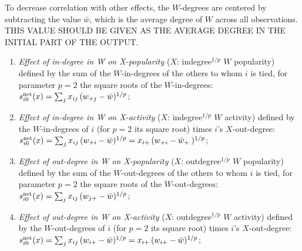 \documentclass[a4paper,fleqn]{article}
\newcommand{\+}{\, + \,}
\newcommand{\vit}{\theenumi}
\newcounter{savenumi}
\begin{document}
{To decrease correlation with other effects, the
$W$-degrees are centered by subtracting the value $\bar w$,
which is the average degree of $W$ across all observations.\\
THIS VALUE SHOULD BE GIVEN AS THE AVERAGE DEGREE IN THE INITIAL PART
OF THE OUTPUT.

\begin{enumerate}
\setcounter{enumi}{\value{savenumi}}
 \item {\em Effect of in-degree in W on X-popularity } ($X$: indegree$^{1/p}$ $W$ popularity)
 defined by   the sum of  the $W$-in-degrees of the others to whom $i$ is tied,
 for parameter $p = 2$ the square roots of the $W$-in-degrees:\\
 $s^{\rm net}_{i\vit}(x) =  \sum_j x_{ij}\, (w_{+j} - \bar w)^{1/p}  $;\\

 \item {\em Effect of in-degree in W on X-activity } ($X$: indegree$^{1/p}$ $W$ activity)
 defined by the $W$-in-degrees of $i$ (for $p = 2$ its square root)
 times $i$'s $X$-out-degree:\\
 $s^{\rm net}_{i\vit}(x) =  \sum_j x_{ij}\, (w_{+i} - \bar w)^{1/p}
                 =  x_{i+}\, (w_{+i} - \bar w_{+.}) ^{1/p} $;\\

 \item {\em Effect of out-degree in W on X-popularity } ($X$: outdegree$^{1/p}$ $W$ popularity)
 defined by   the sum of  the $W$-out-degrees of the others to whom $i$ is tied,
 for parameter $p = 2$ the square roots of the $W$-out-degrees:\\
 $s^{\rm net}_{i\vit}(x) =  \sum_j x_{ij}\, (w_{j+} - \bar w)^{1/p}  $;\\

 \item {\em Effect of out-degree  in W on X-activity } ($X$: outdegree$^{1/p}$ $W$ activity)
 defined by the $W$-out-degrees of $i$ (for $p = 2$ its square root)
 times $i$'s $X$-out-degree:\\
 $s^{\rm net}_{i\vit}(x) =  \sum_j x_{ij}\, (w_{i+} - \bar w)^{1/p} =
                           x_{i+}\, (w_{i+} - \bar w)^{1/p} $;\\


\end{enumerate}}
\end{document}
